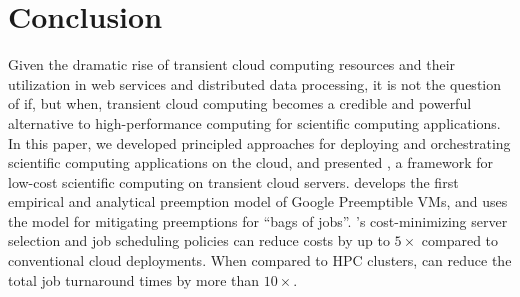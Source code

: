 
\section{Conclusion}
\label{sec:conclusion}
Given the dramatic rise of transient cloud computing resources and their utilization in web services and distributed data processing, it is not the question of if, but when, transient cloud computing becomes a credible and powerful alternative to high-performance computing for scientific computing applications. 
In this paper, we developed principled approaches for deploying and orchestrating scientific computing applications on the cloud, and presented \sysname, a framework for low-cost scientific computing on  transient cloud servers. 
\sysname develops the first empirical and analytical preemption model of Google Preemptible VMs, and uses the model for mitigating preemptions for ``bags of jobs''. 
\sysname's cost-minimizing server selection and job scheduling policies can reduce costs by up to $5\times$ compared to conventional cloud deployments.
When compared to HPC clusters, \sysname can reduce the total job turnaround times by more than $10\times$. 


